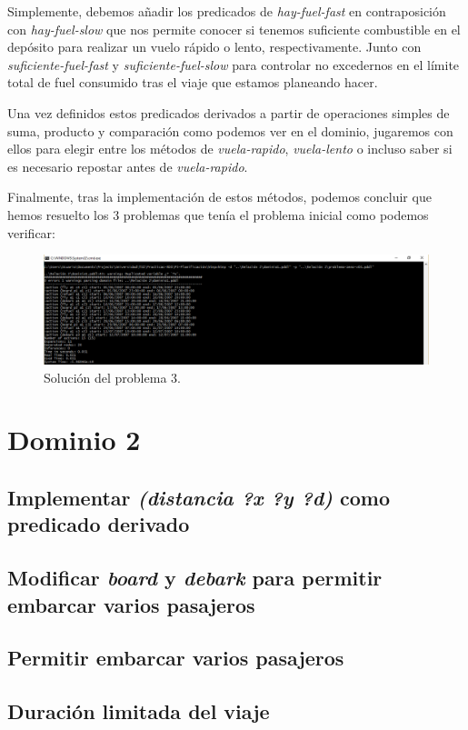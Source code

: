 \documentclass[a4paper, 11pt]{article}
\begin{document}
		Simplemente, debemos añadir los predicados de \textit{hay-fuel-fast} en contraposición con
		\textit{hay-fuel-slow} que nos permite conocer si tenemos suficiente combustible en el depósito
		para realizar un vuelo rápido o lento, respectivamente. Junto con \textit{suficiente-fuel-fast} y
		\textit{suficiente-fuel-slow} para controlar no excedernos en el límite total de fuel consumido tras
		el viaje que estamos planeando hacer.
		
		Una vez definidos estos predicados derivados a partir de operaciones simples de suma, producto y
		comparación como podemos ver en el dominio, jugaremos con ellos para elegir entre los métodos de
		\textit{vuela-rapido}, \textit{vuela-lento} o incluso saber si es necesario repostar antes de
		\textit{vuela-rapido}.
		
		Finalmente, tras la implementación de estos métodos, podemos concluir que hemos resuelto los 3
		problemas que tenía el problema inicial como podemos verificar:
		\begin{figure}[H]
			\centering
			\includegraphics[width=15cm]{Ej1-Problema3.png}
			\caption{Solución del problema 3.}
			\label{Prob-3}
		\end{figure}

\section{Dominio 2}
	\subsection{Implementar \textit{(distancia ?x ?y ?d)} como predicado derivado}
	\subsection{Modificar \textit{board} y \textit{debark} para permitir embarcar varios pasajeros}
	\subsection{Permitir embarcar varios pasajeros}
	\subsection{Duración limitada del viaje}
\end{document}
